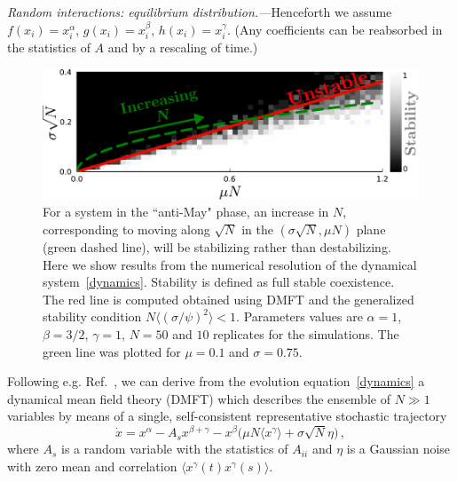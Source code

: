 \emph{Random interactions: equilibrium distribution.---}Henceforth we assume $f(x_i)=x_i^{\alpha}$, $g(x_i)=x_i^{\beta}$, $h(x_i)=x_i^{\gamma}$. 
(Any coefficients can be reabsorbed in the statistics of $A$ and by a rescaling of time.)
\begin{figure}[t!]
    \includegraphics[width=.45\textwidth]{figs/beta1_5-S50-N10-diversity-increase.pdf}
    \caption{For a system in the ``anti-May" phase, an increase in $N$,
    corresponding to moving along $\sqrt{N}$ in the $(\sigma \sqrt{N},\mu N)$ plane (green dashed line), will be stabilizing rather than destabilizing.
    Here we show results from the numerical resolution of the dynamical system~\eqref{dynamics}. Stability is defined as full stable coexistence. The red line is computed obtained using DMFT and the generalized stability condition $N\langle (\sigma/\psi)^2\rangle < 1$.
    Parameters values are $\alpha=1$, $\beta=3/2$,
    $\gamma=1$, $N=50$ and $10$ replicates for the simulations. The green line was plotted for $\mu=0.1$ and $\sigma=0.75$.}
    \label{fig: stability line + sims}
\end{figure}
Following e.g. Ref.~\cite{Roy2019}, we can derive from the evolution equation~\eqref{dynamics} a dynamical mean field theory (DMFT) 
which describes the ensemble of $N\gg 1$ variables
by means of a single, self-consistent representative stochastic trajectory
\begin{equation}
    \dot{x} = x^{\alpha}-A_sx^{\beta+\gamma}-x^{\beta}\big( \mu N \langle x^{\gamma}\rangle + \sigma \sqrt{N} \eta\big) \, ,
\label{eq: dmft}
\end{equation}
where $A_s$ is a random variable with the statistics of $A_{ii}$ and $\eta$ is a Gaussian noise with zero mean and correlation $\langle x^{\gamma}(t)x^{\gamma}(s)\rangle$. 
